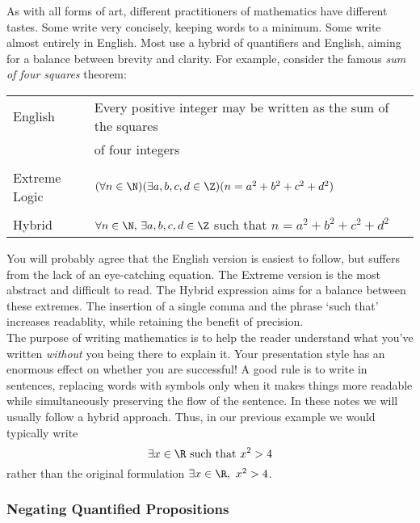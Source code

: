 \begin{aside}

As with all forms of art, different practitioners of mathematics have different tastes. Some write very concisely, keeping words to a minimum. Some write almost entirely in English. Most use a hybrid of quantifiers and English, aiming for a balance between brevity and clarity. For example, consider the famous \emph{sum of four squares} theorem:
\begin{center}
\begin{tabular}{l|l}
English & Every positive integer may be written as the sum of the squares\\
&of four integers\\[4pt]\hline
\\[-8pt]
Extreme Logic & $(\forall n\in\N)(\exists a,b,c,d\in\Z)(n=a^2+b^2+c^2+d^2)$\\[4pt]\hline
\\[-8pt]
Hybrid & $\forall n\in\N,\, \exists a,b,c,d\in\Z$ such that $n=a^2+b^2+c^2+d^2$
\end{tabular}
\end{center}
You will probably agree that the English version is easiest to follow, but suffers from the lack of an eye-catching equation. The Extreme  version is the most abstract and difficult to read. The Hybrid expression aims for a balance between these extremes. The insertion of a single comma and the phrase `such that' increases readablity, while retaining the benefit of precision.\\

\noindent The purpose of writing mathematics is to help the reader understand what you've written \emph{without} you being there to explain it. Your presentation style has an enormous effect on whether you are successful! A good rule is to write in sentences, replacing words with symbols only when it makes things more readable while simultaneously preserving the flow of the sentence. In these notes we will usually follow a hybrid approach. Thus, in our previous example we would typically write
\[\exists x\in\R\text{ such that } x^2>4\]
rather than the original formulation $\exists x\in\R,\ x^2>4$.
\end{aside}\goodbreak


\subsubsection*{Negating Quantified Propositions}

